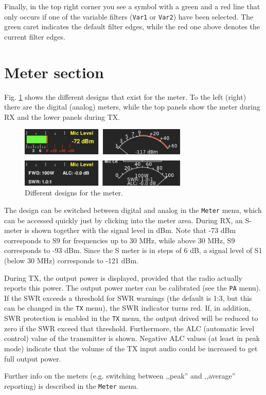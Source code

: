 \documentclass[12pt]{book}
\def\bltt#1{\texttt{\color{blue}#1}}
\begin{document}
Finally, in the top right corner you see a symbol with a green and a red line
that only occurs if
one of the variable filters (\texttt{Var1} or \texttt{Var2}) have been
selected. The green caret indicates the default filter edges,  while the
red one above denotes the current filter edges. 

\section{Meter section}
\label{sec:MeterSection}
Fig. \ref{fig:MeterDesigns} shows the different designs that exist for
the meter. To the left (right) there are the digital (analog) meters,
while the top panels show the meter during RX and the lower panels
during TX.

\begin{figure}[h]
\center
\includegraphics[width=8cm]{MeterDesigns.png}
\caption{Different designs for the meter.}
\label{fig:MeterDesigns}
\end{figure}

The design can be switched between digital and analog in the \bltt{Meter}
menu, which can be accessed quickly just by clicking into the meter area.
During RX, an S-meter is shown together with the signal level in dBm. Note
that -73 dBm corresponds to S9 for frequencies up to 30 MHz, while above
30 MHz, S9 corresponds to -93 dBm. Since the S meter is in steps of
6 dB, a signal level of S1 (below 30 MHz) corresponds to -121 dBm.

During TX, the output power is displayed, provided that the radio actually
reports this power. The output power meter can be calibrated (see the \bltt{PA}
menu). If the SWR exceeds a threshold for SWR warnings (the default is 1:3, but
this can be changed in the \bltt{TX} menu), the SWR indicator turns red. If, 
in addition, SWR protection is enabled in the \bltt{TX} menu, the output
drived  will be reduced to zero if the SWR exceed that threshold.
Furthermore, the ALC (automatic level control) value of the transmitter is 
shown. Negative ALC values (at least in peak mode) indicate that the volume of the TX input audio
could be increased to get full output  power.

Further info on the meters (e.g. switching between ,,peak'' and ,,average'' reporting)
is described in the \bltt{Meter} menu.
\end{document}
